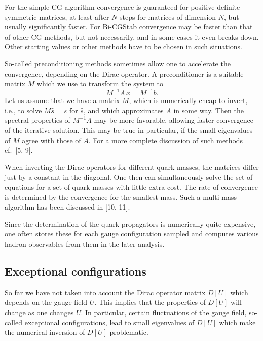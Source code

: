 For the simple CG algorithm convergence is guaranteed for positive definite
symmetric matrices, at least after $N$ steps for matrices of dimension $N$, but
usually significantly faster. For Bi-CGStab convergence may be faster than that
of other CG methods, but not necessarily, and in some cases it even breaks
down. Other starting values or other methods have to be chosen in such
situations.

So-called preconditioning methods sometimes allow one to accelerate the
convergence, depending on the Dirac operator. A preconditioner is a suitable
matrix $M$ which we use to transform the system to
\begin{equation}
  M^{-1} A\, x = M^{-1} b .
\end{equation}
Let us assume that we have a matrix $M$, which is numerically cheap to invert,
i.e., to solve $M\hat{s} = s$ for $\hat{s}$, and which approximates $A$ in some
way. Then the spectral properties of $M^{-1}A$ may be more favorable, allowing
faster convergence of the iterative solution. This may be true in particular,
if the small eigenvalues of $M$ agree with those of $A$. For a more complete
discussion of such methods cf.\ [5, 9].

When inverting the Dirac operators for different quark masses, the matrices
differ just by a constant in the diagonal. One then can simultaneously solve
the set of equations for a set of quark masses with little extra cost. The rate
of convergence is determined by the convergence for the smallest mass. Such a
multi-mass algorithm has been discussed in [10, 11].

Since the determination of the quark propagators is numerically quite
expensive, one often stores these for each gauge configuration sampled and
computes various hadron observables from them in the later analysis.

\subsection{Exceptional configurations}

So far we have not taken into account the Dirac operator matrix $D[U]$ which
depends on the gauge field $U$. This implies that the properties of $D[U]$ will
change as one changes $U$. In particular, certain fluctuations of the gauge
field, so-called exceptional configurations, lead to small eigenvalues of
$D[U]$ which make the numerical inversion of $D[U]$ problematic.

